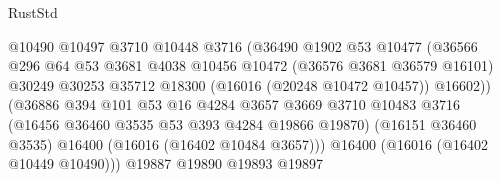\begin{lexlean}{RustStd}
\begin{coremodule}
                                              @10490
                                              @10497
                                              @3710
                                              @10448
                                              @3716
                                              (@36490
                                                @1902
                                                @53
                                                @10477
                                                (@36566
                                                  @296
                                                  @64
                                                  @53
                                                  @3681
                                                  @4038
                                                  @10456
                                                  @10472
                                                  (@36576 @3681 @36579 @16101)
                                                  @30249
                                                  @30253
                                                  @35712
                                                  @18300
                                                  (@16016 (@20248 @10472 @10457))
                                                  @16602))
                                              (@36886
                                                @394
                                                @101
                                                @53
                                                @16
                                                @4284
                                                @3657
                                                @3669
                                                @3710
                                                @10483
                                                @3716
                                                (@16456 @36460 @3535 @53 @393 @4284 @19866 @19870)
                                                (@16151 @36460 @3535)
                                                @16400
                                                (@16016 (@16402 @10484 @3657)))
                                              @16400
                                              (@16016 (@16402 @10449 @10490)))
                                            @19887
                                            @19890
                                            @19893
                                            @19897

\end{coremodule}
\end{lexlean}
